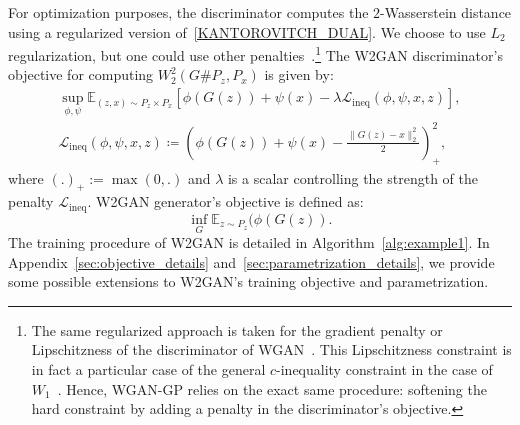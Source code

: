 \documentclass[runningheads]{llncs}
\begin{document}
For optimization purposes, the discriminator computes the $2$-Wasserstein distance using a regularized version of~\eqref{KANTOROVITCH_DUAL}. We choose to use  $L_2$ regularization, but one could use other penalties~\citep{cuturi2013sinkhorn,Seguy2018LSOT,Blondel2018}.\footnote{The same regularized approach is taken for the gradient penalty or Lipschitzness of the discriminator of WGAN~\citep{gulrajani2017improved, petzka2018on}. This Lipschitzness constraint is in fact a particular case of the general $c$-inequality constraint in the case of $W_1$~\citep{Villani}. Hence, WGAN-GP relies on the exact same procedure: softening the hard constraint by adding a penalty in the discriminator's objective.} The W2GAN discriminator's objective for computing $W_2^2(G\#P_z,P_x)$ is given by:
\begin{equation}
 \begin{gathered}
       \sup_{\phi,\psi} \mathds{E}_{(z,x)\sim P_z \times P_x}\left[\phi(G(z))+\psi(x) 
        -\lambda \mathcal{L}_{\text{ineq}}(\phi,\psi,x,z) \right], \\
    \mathcal{L}_{\text{ineq}}(\phi,\psi,x,z) \coloneqq \left(\phi(G(z))+\psi(x)-\frac{\|G(z)-x\|_2^2}{2}\right)_{+}^2,
\end{gathered}
      \label{LOSS_DISCRIMINATOR_GAN_INEQONLY}
 \end{equation}
 where $(.)_+:= \max(0,.)$ and $\lambda$ is a scalar controlling the strength of the penalty $\mathcal{L}_{\text{ineq}}$.
 W2GAN generator's objective is defined as: 
  \begin{equation}
       \inf_G \mathds{E}_{z\sim P_z}(\phi(G(z)).
      \label{LOSS_GENERATOR_W2}
 \end{equation}
The training procedure of W2GAN is detailed in Algorithm~\ref{alg:example1}. In Appendix~\ref{sec:objective_details} and~\ref{sec:parametrization_details}, we provide some possible extensions to W2GAN's training objective and parametrization.
\end{document}
